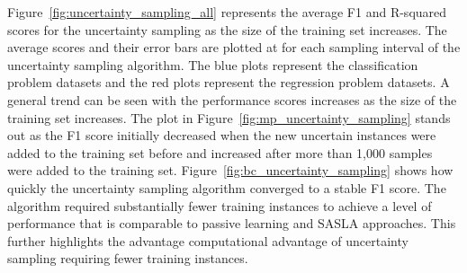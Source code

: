 \documentclass[conference]{IEEEtran}
\begin{document}
	Figure~\ref{fig:uncertainty_sampling_all} represents the average F1 and R-squared scores for the uncertainty sampling as the size of the training set increases. The average scores and their error bars are plotted at for each sampling interval of the uncertainty sampling algorithm. The blue plots represent the classification problem datasets and the red plots represent the regression problem datasets. A general trend can be seen with the performance scores increases as the size of the training set increases. The plot in Figure~\ref{fig:mp_uncertainty_sampling} stands out as the F1 score initially decreased when the new uncertain instances were added to the training set before and increased after more than 1,000 samples were added to the training set. Figure~\ref{fig:bc_uncertainty_sampling} shows how quickly the uncertainty sampling algorithm converged to a stable F1 score. The algorithm required substantially fewer training instances to achieve a level of performance that is comparable to passive learning and SASLA approaches. This further highlights the advantage computational advantage of uncertainty sampling requiring fewer training instances.
	
\end{document}

